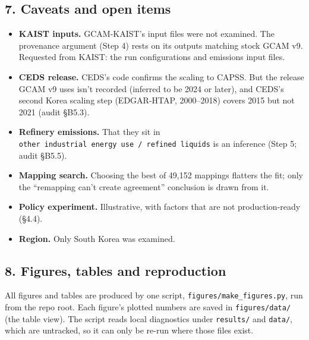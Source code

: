 \hypertarget{caveats-and-open-items}{%
\subsection*{7. Caveats and open items}\label{caveats-and-open-items}}

\begin{itemize}
\tightlist
\item
  \textbf{KAIST
  inputs.}
  GCAM-KAIST's
  input
  files
  were not
  examined.
  The
  provenance
  argument
  (Step 4)
  rests on
  its
  outputs
  matching
  stock
  GCAM v9.
  Requested
  from
  KAIST:
  the run
  configurations
  and
  emissions
  input
  files.
\item
  \textbf{CEDS release.} CEDS's code confirms the scaling to CAPSS. But the
  release GCAM v9 uses isn't recorded (inferred to be 2024 or later), and CEDS's
  second Korea scaling step (EDGAR-HTAP, 2000--2018) covers 2015 but not 2021
  (audit §B5.3).
\item
  \textbf{Refinery
  emissions.}
  That
  they sit
  in
  \texttt{other\ industrial\ energy\ use\ /\allowbreak{}\ refined\ liquids}
  is an
  inference
  (Step 5;
  audit
  §B5.5).
\item
  \textbf{Mapping
  search.}
  Choosing
  the best
  of
  49,152
  mappings
  flatters
  the fit;
  only the
  ``remapping
  can't
  create
  agreement''
  conclusion
  is drawn
  from it.
\item
  \textbf{Policy
  experiment.}
  Illustrative,
  with
  factors
  that are
  not
  production-ready
  (§4.4).
\item
  \textbf{Region.}
  Only
  South
  Korea
  was
  examined.
\end{itemize}

\hypertarget{figures-tables-and-reproduction}{%
\subsection*{8. Figures, tables and reproduction}\label{figures-tables-and-reproduction}}

All
figures
and tables
are
produced
by one
script,
{\texttt{figures/\allowbreak{}make\_\allowbreak{}figures.\allowbreak{}py}},
run from
the repo
root. Each
figure's
plotted
numbers
are saved
in
\texttt{figures/\allowbreak{}data/\allowbreak{}}
(the table
view). The
script
reads
local
diagnostics
under
\texttt{results/\allowbreak{}}
and
\texttt{data/\allowbreak{}},
which are
untracked,
so it can
only be
re-run
where
those
files
exist.


